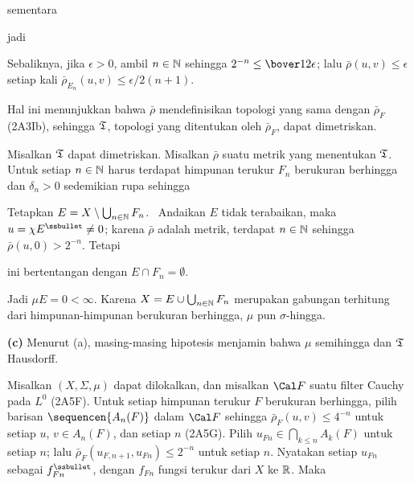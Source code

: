 {

\noindent sementara



\noindent jadi


Sebaliknya, jika $\epsilon>0$, ambil $n\in\Bbb N$ sehingga
$2^{-n}\le\bover12\epsilon$;  lalu $\bar\rho(u,v)\le\epsilon$ setiap kali
$\bar\rho_{E_n}(u,v)\le\epsilon/2(n+1)$.

Hal ini menunjukkan bahwa $\bar\rho$ mendefinisikan topologi yang sama dengan
$\bar\rho_F$ (2A3Ib), sehingga $\frak T$, topologi yang ditentukan oleh
$\bar\rho_F$, dapat dimetriskan.

\medskip

 Misalkan $\frak T$ dapat dimetriskan. Misalkan $\bar\rho$
suatu metrik yang menentukan $\frak T$. Untuk setiap $n\in\Bbb N$ harus
terdapat himpunan terukur $F_n$ berukuran berhingga dan $\delta_n>0$ sedemikian
rupa sehingga


\noindent Tetapkan $E=X\setminus\bigcup_{n\in\Bbb N}F_n$. \Quer\ Andaikan $E$
tidak terabaikan, maka $u=\chi E^{\ssbullet}\ne 0$; karena $\bar\rho$
adalah metrik, terdapat $n\in\Bbb N$ sehingga $\bar\rho(u,0)>2^{-n}$. Tetapi



\noindent ini bertentangan dengan $E\cap F_n=\emptyset$.\ \Bang

Jadi $\mu E=0<\infty$. Karena $X=E\cup\bigcup_{n\in\Bbb N}F_n$ merupakan
gabungan terhitung dari himpunan-himpunan berukuran berhingga, $\mu$ pun
$\sigma$-hingga.

\medskip

{\bf (c)} Menurut (a), masing-masing hipotesis menjamin bahwa $\mu$ semihingga
dan $\frak T$ Hausdorff.

\medskip

 Misalkan $(X,\Sigma,\mu)$ dapat dilokalkan, dan misalkan $\Cal F$
suatu filter Cauchy pada $L^0$ (2A5F). Untuk setiap himpunan terukur $F$
berukuran berhingga, pilih barisan $\sequencen{A_n(F)}$ dalam
$\Cal F$ sehingga $\bar\rho_F(u,v)\le 4^{-n}$ untuk setiap $u$, $v\in A_n(F)$,
dan setiap $n$ (2A5G). Pilih $u_{Fn}\in\bigcap_{k\le n}A_k(F)$ untuk setiap
$n$;  lalu $\bar\rho_F(u_{F,n+1},u_{Fn})\le 2^{-n}$ untuk setiap $n$.
Nyatakan setiap $u_{Fn}$ sebagai $f_{Fn}^{\ssbullet}$, dengan $f_{Fn}$
fungsi terukur dari $X$ ke $\Bbb R$. Maka

}
